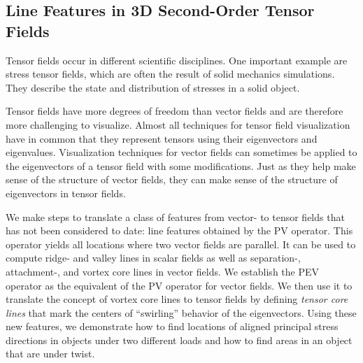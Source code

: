 \subsection{Line Features in \ac{3D} Second-Order Tensor Fields} %
\label{sub:contr_tensor_fields}
%
Tensor fields occur in different scientific disciplines.
%
One important example are stress tensor fields, which are often the result of
solid mechanics simulations.
%
They describe the state and distribution of stresses in a solid object.
%

%
Tensor fields have more degrees of freedom than vector fields and are therefore
more challenging to visualize.
%
Almost all techniques for tensor field visualization have in common that they
represent tensors using their eigenvectors and eigenvalues.
%
Visualization techniques for vector fields can sometimes be applied to the
eigenvectors of a tensor field with some modifications.
%
Just as they help make sense of the structure of vector fields, they can make
sense of the structure of eigenvectors in tensor fields.
%

%
We make steps to translate a class of features from vector- to tensor fields
that has not been considered to date:
%
line features obtained by the \ac{PV} operator.
%
This operator yields all locations where two vector fields are parallel.
%
It can be used to compute ridge- and valley lines in scalar fields as well as
separation-, attachment-, and vortex core lines in vector fields.
%
We establish the \ac{PEV} operator as the equivalent of the \ac{PV} operator
for vector fields.
%
We then use it to translate the concept of vortex core lines to tensor fields by
defining \emph{tensor core lines} that mark the centers of ``swirling'' behavior
of the eigenvectors.
%
Using these new features, we demonstrate how to find locations of aligned
principal stress directions in objects under two different loads and how to find
areas in an object that are under twist.
%
%
%
